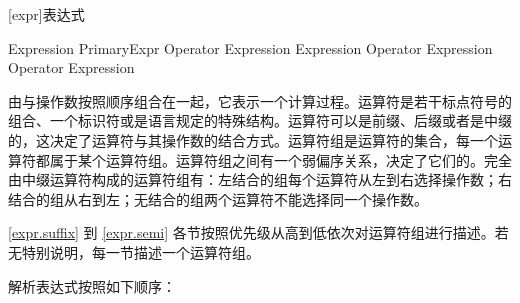 
[expr]{表达式}

\begin{bnf}{Expression}
    PrimaryExpr \br
    Operator Expression \br
    Expression Operator \br
    Expression Operator Expression \br
\end{bnf}

\pnum
{}由与操作数按照顺序组合在一起，它表示一个计算过程。运算符是若干标点符号的组合、一个标识符或是语言规定的特殊结构。运算符可以是前缀、后缀或者是中缀的，这决定了运算符与其操作数的结合方式。运算符组是运算符的集合，每一个运算符都属于某个运算符组。运算符组之间有一个弱偏序关系，决定了它们的。完全由中缀运算符构成的运算符组有：左结合的组每个运算符从左到右选择操作数；右结合的组从右到左；无结合的组两个运算符不能选择同一个操作数。

\pnum
\ref{expr.suffix} 到 \ref{expr.semi} 各节按照优先级从高到低依次对运算符组进行描述。若无特别说明，每一节描述一个运算符组。

\pnum
解析表达式按照如下顺序：

